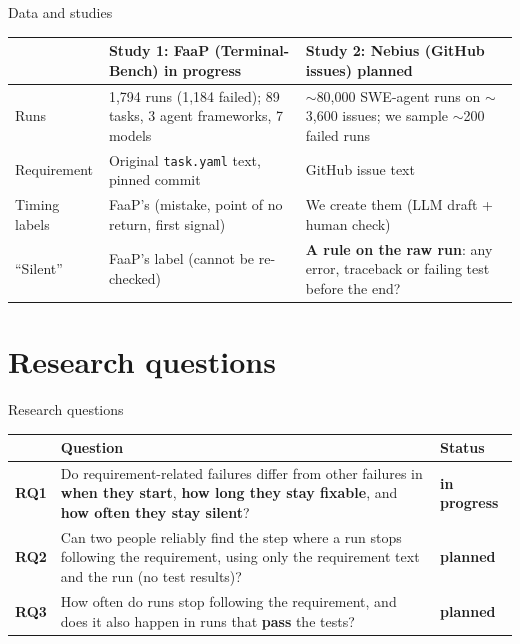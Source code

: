 \documentclass[aspectratio=169,11pt]{beamer}
\newcommand{\now}{{\small\color{accentAmber}\textbf{in progress}}}
\newcommand{\todo}{{\small\color{gray}\textbf{planned}}}
\begin{document}
\begin{frame}{Data and studies}
  \small
  \begin{tabularx}{\textwidth}{@{}lLL@{}}
    \toprule
      & \textbf{Study 1: FaaP (Terminal-Bench)} \hfill \now & \textbf{Study 2: Nebius (GitHub issues)} \hfill \todo \\
    \midrule
    Runs & 1,794 runs (1,184 failed); 89 tasks, 3 agent frameworks, 7 models & $\sim$80,000 SWE-agent runs on $\sim$3,600 issues; we sample $\sim$200 failed runs \\
    Requirement & Original \texttt{task.yaml} text, pinned commit & GitHub issue text \\
    Timing labels & FaaP's (mistake, point of no return, first signal) & We create them (LLM draft + human check) \\
    ``Silent'' & FaaP's label (cannot be re-checked) & \textbf{A rule on the raw run}: any error, traceback or failing test before the end? \\
    \bottomrule
  \end{tabularx}
\end{frame}

\section{Research questions}

\begin{frame}{Research questions}
  \begin{tabularx}{\textwidth}{@{}lLl@{}}
    \toprule
    & \textbf{Question} & \textbf{Status} \\
    \midrule
    \textbf{RQ1} & Do requirement-related failures differ from other failures in \textbf{when they start},
      \textbf{how long they stay fixable}, and \textbf{how often they stay silent}? & \now \\[4pt]
    \textbf{RQ2} & Can two people reliably find the step where a run stops following the requirement,
      using only the requirement text and the run (no test results)? & \todo \\[4pt]
    \textbf{RQ3} & How often do runs stop following the requirement, and does it also happen in runs that
      \textbf{pass} the tests? & \todo \\
    \bottomrule
  \end{tabularx}
\end{frame}

\end{document}
